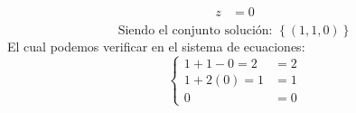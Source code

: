 \documentclass{article}
\begin{document}
\begin{enumerate}
\begin{enumerate}[label=\listAlph]
\[\begin{aligned}
                        z &= 0 \\
                    \end{aligned}
                \]
                \[
                    \text{Siendo el conjunto solución: }
                    \left\{\left(1, 1, 0\right)\right\}
                \]
                El cual podemos verificar en el sistema de ecuaciones:
                \[
                    \left\{
                        \begin{aligned}
                            1 + 1 - 0 = 2 &= 2 \\
                            1 + 2\left(0\right) = 1 &= 1 \\
                            0 &= 0
                        \end{aligned}
                    \right.
                \]
        \end{enumerate}


\end{enumerate}
\end{document}
